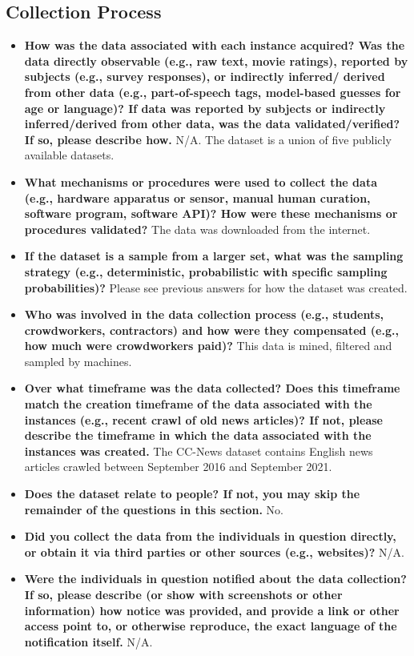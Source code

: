 \subsection{Collection Process}
\begin{itemize}
    \item \textbf{How was the data associated with each instance acquired? Was the data directly observable (e.g., raw text, movie ratings), reported by subjects (e.g., survey responses), or indirectly inferred/ derived from other data (e.g., part-of-speech tags, model-based guesses for age or language)? If data was reported by subjects or indirectly inferred/derived from other data, was the data validated/verified? If so, please describe how.} N/A. The dataset is a union of five publicly available datasets.
    \item \textbf{What mechanisms or procedures were used to collect the data (e.g., hardware apparatus or sensor, manual human curation, software program, software API)? How were these mechanisms or procedures validated?} The data was downloaded from the internet.
    \item \textbf{If the dataset is a sample from a larger set, what was the sampling strategy (e.g., deterministic, probabilistic with specific sampling probabilities)?} Please see previous answers for how the dataset was created.
    \item \textbf{Who was involved in the data collection process (e.g., students, crowdworkers, contractors) and how were they compensated (e.g., how much were crowdworkers paid)?} This data is mined, filtered and sampled by machines.
    \item \textbf{Over what timeframe was the data collected? Does this timeframe match the creation timeframe of the data associated with the instances (e.g., recent crawl of old news articles)? If not, please describe the timeframe in which the data associated with the instances was created.} The CC-News dataset contains English news articles crawled between September 2016 and September 2021.
    \item \textbf{Does the dataset relate to people? If not, you may skip the remainder of the questions in this section.} No.
    \item \textbf{Did you collect the data from the individuals in question directly, or obtain it via third parties or other sources (e.g., websites)?} N/A.
    \item \textbf{Were the individuals in question notified about the data collection? If so, please describe (or show with screenshots or other information) how notice was provided, and provide a link or other access point to, or otherwise reproduce, the exact language of the notification itself.} N/A.

\end{itemize}
